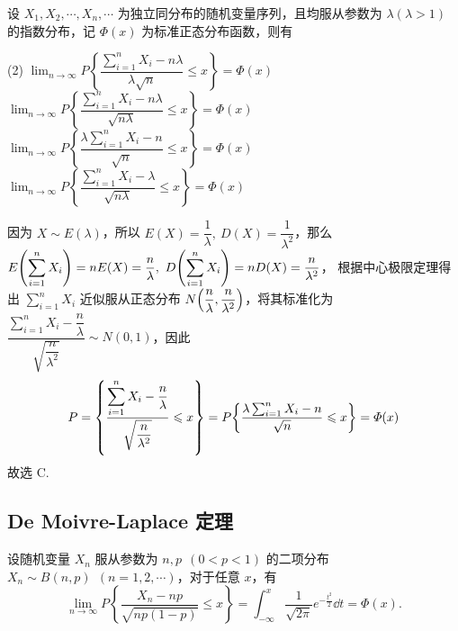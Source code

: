 \begin{example}
    设 $ X_{1}, X_{2}, \cdots, X_{n}, \cdots $ 为独立同分布的随机变量序列，且均服从参数为 $ \lambda(\lambda>1) $ 的指数分布，记 $ \varPhi(x) $ 为标准正态分布函数，则有
    \begin{tasks}(2)
        \task $\displaystyle \lim _{n \rightarrow \infty} P\left\{\dfrac{\sum_{i=1}^{n} X_{i}-n \lambda}{\lambda \sqrt{n}} \leqslant x\right\}=\varPhi(x) $
        \task $\displaystyle \lim _{n \rightarrow \infty} P\left\{\dfrac{\sum_{i=1}^{n} X_{i}-n \lambda}{\sqrt{n \lambda}} \leqslant x\right\}=\varPhi(x) $
        \task $\displaystyle \lim _{n \rightarrow \infty} P\left\{\dfrac{\lambda \sum_{i=1}^{n} X_{i}-n}{\sqrt{n}} \leqslant x\right\}=\varPhi(x) $
        \task $\displaystyle \lim _{n \rightarrow \infty} P\left\{\dfrac{\sum_{i=1}^{n} X_{i}-\lambda}{\sqrt{n \lambda}} \leqslant x\right\}=\varPhi(x) $
    \end{tasks}
\end{example}
\begin{solution}
    因为 $X\sim E(\lambda)$，所以 $E(X)=\dfrac{1}{\lambda},~D(X)=\dfrac{1}{\lambda^2}$，那么 $E\qty(\displaystyle\sum_{i=1}^{n}X_i)=nE(X)=\dfrac{n}{\lambda},~D\qty(\displaystyle \sum_{i=1}^{n}X_i)=nD(X)=\dfrac{n}{\lambda^2}$，
    根据中心极限定理得出 $\displaystyle\sum_{i=1}^{n}X_i$ 近似服从正态分布 $N\qty(\dfrac{n}{\lambda},\dfrac{n}{\lambda^2})$，将其标准化为 $\dfrac{\displaystyle\sum_{i=1}^{n}X_i-\dfrac{n}{\lambda}}{\sqrt{\dfrac{n}{\lambda^2}}}\sim N(0,1)$，因此 
    $$P=\qty{\dfrac{\displaystyle\sum_{i=1}^{n}X_i-\dfrac{n}{\lambda}}{\sqrt{\dfrac{n}{\lambda^2}}}\leqslant x}=P\qty{\dfrac{\lambda\sum_{i=1}^{n}X_i-n}{\sqrt{n}}\leqslant x}=\varPhi(x)$$
    故选 C.
\end{solution}

\subsection{De Moivre-Laplace 定理}

\begin{theorem}
    设随机变量 $ X_{n} $ 服从参数为 $ n, p~~(0<p<1)$ 的二项分布 $ X_{n} \sim B(n, p)~~(n=1,2, \cdots) $，对于任意 $ x $，有
    $$\lim _{n \rightarrow \infty} P\left\{\frac{X_{n}-n p}{\sqrt{n p(1-p)}} \leqslant x\right\}=\int_{-\infty}^{x} \frac{1}{\sqrt{2 \pi}} e^{-\frac{t^{2}}{2}} \dd  t=\varPhi(x).$$
\end{theorem}
